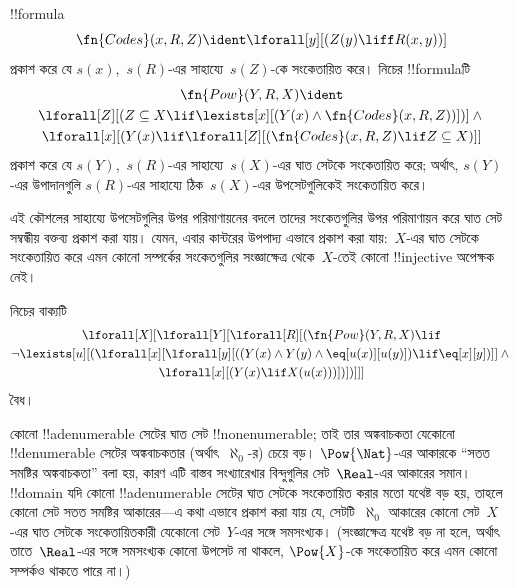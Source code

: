 \documentclass[../../../include/open-logic-section]{subfiles}
\begin{document}
\begin{prop}
!!{formula}
  \[
  \fn{Codes}(x, R, Z) \ident \lforall[y][(Z(y) \liff
    R(x, y))]
  \]
প্রকাশ করে যে $s(x)$,~$s(R)$-এর সাহায্যে~$s(Z)$-কে সংকেতায়িত করে।
নিচের !!{formula}টি
\begin{multline*}
  \fn{Pow}(Y, R, X) \ident \\
  \lforall[Z][(Z \subseteq X \lif \lexists[x][(Y(x) \land
    \fn{Codes}(x, R, Z))])] \land {} \\ \lforall[x][(Y(x) \lif
  \lforall[Z][(\fn{Codes}(x, R, Z) \lif Z \subseteq X)]]
\end{multline*}
প্রকাশ করে যে $s(Y)$,~$s(R)$-এর সাহায্যে~$s(X)$-এর ঘাত সেটকে সংকেতায়িত
করে; অর্থাৎ, $s(Y)$-এর উপাদানগুলি $s(R)$-এর সাহায্যে ঠিক~$s(X)$-এর
উপসেটগুলিকেই সংকেতায়িত করে।
\end{prop}

\begin{explain}
এই কৌশলের সাহায্যে উপসেটগুলির উপর পরিমাণায়নের বদলে তাদের সংকেতগুলির উপর
পরিমাণায়ন করে ঘাত সেট সম্বন্ধীয় বক্তব্য প্রকাশ করা যায়। যেমন, এবার
কান্টরের উপপাদ্য এভাবে প্রকাশ করা যায়:~$X$-এর ঘাত সেটকে সংকেতায়িত করে
এমন কোনো সম্পর্কের সংকেতগুলির সংজ্ঞাক্ষেত্র থেকে~$X$-তেই কোনো
!!{injective} অপেক্ষক নেই।
\end{explain}

\begin{prop}
নিচের বাক্যটি
\begin{multline*}
  \lforall[X][\lforall[Y][\lforall[R][(\fn{Pow}(Y, R, X) \lif \\
      \lnot \lexists[u][(\lforall[x][\lforall[y][((Y(x) \land Y(y) \land
            \eq[u(x)][u(y)]) \lif \eq[x][y])]] \land {}\\
        \lforall[x][(Y(x) \lif X(u(x)))])])]]]
\end{multline*}
বৈধ।
\end{prop}

\begin{explain}
কোনো !!a{denumerable} সেটের ঘাত সেট !!{nonenumerable}; তাই তার অঙ্কবাচকতা
যেকোনো !!{denumerable} সেটের অঙ্কবাচকতার (অর্থাৎ~$\aleph_0$-র) চেয়ে
বড়। $\Pow{\Nat}$-এর আকারকে ``সতত সমষ্টির অঙ্কবাচকতা'' বলা হয়, কারণ
এটি বাস্তব সংখ্যারেখার বিন্দুগুলির সেট~$\Real$-এর আকারের সমান।
!!{domain} যদি কোনো !!a{denumerable} সেটের ঘাত সেটকে সংকেতায়িত করার মতো
যথেষ্ট বড় হয়, তাহলে কোনো সেট সতত সমষ্টির আকারের---এ কথা এভাবে প্রকাশ
করা যায় যে, সেটটি~$\aleph_0$ আকারের কোনো সেট~$X$-এর ঘাত সেটকে
সংকেতায়িতকারী যেকোনো সেট~$Y$-এর সঙ্গে সমসংখ্যক। (সংজ্ঞাক্ষেত্র যথেষ্ট বড়
না হলে, অর্থাৎ তাতে~$\Real$-এর সঙ্গে সমসংখ্যক কোনো উপসেট না থাকলে,
$\Pow{X}$-কে সংকেতায়িত করে এমন কোনো সম্পর্কও থাকতে পারে না।)
\end{explain}
\end{document}
